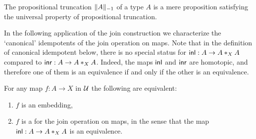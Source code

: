 \begin{cor}
The propositional truncation $\trunc{-1}{A}$ of a type $A$ is a mere proposition satisfying the universal property of propositional truncation. 
\end{cor}

In the following application of the join construction we characterize
the `canonical' idempotents of the join operation on maps. Note that in the
definition of canonical idempotent below, there is no special status for
$\inl:A\to \join[X]{A}{A}$ compared to $\inr:A\to\join[X]{A}{A}$. Indeed, the
maps $\inl$ and $\inr$ are homotopic, and therefore one of them is an
equivalence if and only if the other is an equivalence.

\begin{thm}\label{thm:idempotents}
For any map $f:A\to X$ in $\UU$ the following are equivalent:
\begin{enumerate}
\item $f$ is an embedding,
\item $f$ is a  for the join operation on maps, 
in the sense that the map $\inl:A\to\join[X]{A}{A}$ is an equivalence.
\end{enumerate}
\end{thm}

